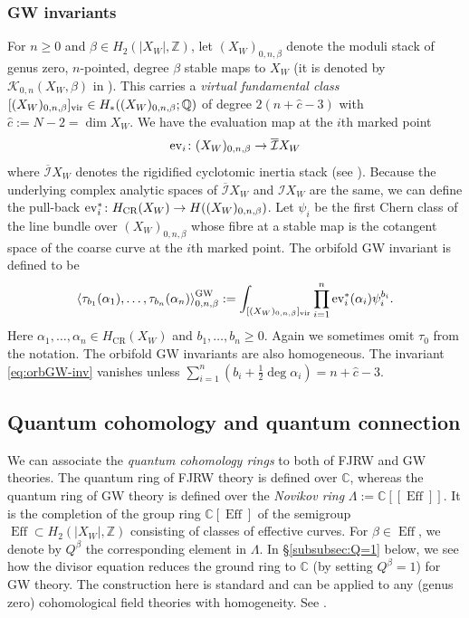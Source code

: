 \documentclass[11pt]{amsart}
\theoremstyle{definition} %
\theoremstyle{remark} %
\newcommand{\CC}{\mathbb C}
\newcommand{\QQ}{\mathbb Q}
\newcommand{\ZZ}{\mathbb Z}
\newcommand{\ev}{{\rm ev}}
\def\GW{\operatorname{\text{GW}}}
\def\CR{\operatorname{\text{CR}}}
\def\corr#1{\left\langle #1 \right\rangle}
\newcommand{\cI}{\mathcal{I}}
\newcommand{\hc}{\hat{c}}
\renewcommand{\GW}{{\operatorname{GW}}}
\renewcommand{\CR}{{\operatorname{CR}}}
\newcommand{\Eff}{\operatorname{Eff}}
\newcommand{\ov}{\overline}
\begin{document}
\subsubsection{GW invariants} 
For $n\ge 0$ and $\beta \in H_2(|X_W|,\ZZ)$, 
let $(X_W)_{0,n,\beta}$ denote the moduli stack 
of genus zero, $n$-pointed, degree $\beta$ 
stable maps to $X_W$ (it is 
denoted by $\mathcal{K}_{0,n}(X_W,\beta)$ in \cite{AGV}). 
This carries a \emph{virtual fundamental class} 
$[(X_W)_{0,n,\beta}]_{\rm vir} \in H_*((X_W)_{0,n,\beta};\QQ)$ 
of degree $2(n+\hc -3)$ with $\hc := N- 2 = \dim X_W$. 
We have the evaluation map at the $i$th marked point 
\[
\ev_i \colon (X_W)_{0,n,\beta} \to \ov{\cI}X_W 
\]
where $\ov{\cI}X_W$ denotes the rigidified cyclotomic 
inertia stack (see \cite{AGV}). 
Because the underlying complex analytic spaces of 
$\ov{\cI}X_W$ and $\cI X_W$ are the same, we can define 
the pull-back $\ev_i^* \colon H_{\CR}(X_W) 
\to H((X_W)_{0,n,\beta})$. 
Let $\psi_i$ be the first Chern class of the 
line bundle over $(X_W)_{0,n,\beta}$ whose fibre 
at a stable map is the cotangent space of the 
coarse curve at the $i$th marked point. 
The orbifold GW 
invariant is defined to be 
\begin{equation} 
\label{eq:orbGW-inv} 
\corr{\tau_{b_1}(\alpha_1),\dots,\tau_{b_n}( \alpha_n)
}^{\GW}_{0,n,\beta} 
:= \int_{[(X_W)_{0,n,\beta}]_{\rm vir}} 
\prod_{i=1}^n \ev_i^*(\alpha_i) \psi_i^{b_i}. 
\end{equation} 
Here $\alpha_1,\dots,\alpha_n \in H_{\CR}(X_W)$ and 
$b_1,\dots,b_n\ge 0$. Again we sometimes 
omit $\tau_0$ from the notation. The orbifold GW 
invariants are also homogeneous. The invariant 
\eqref{eq:orbGW-inv} vanishes unless 
$\sum_{i=1}^n (b_i + \frac{1}{2} \deg \alpha_i) 
= n+ \hc -3$. 

\subsection{Quantum cohomology and quantum connection} 
\label{subsec:qcoh_conn} 
We can associate the \emph{quantum cohomology rings} 
to both of FJRW and GW theories. 
The quantum ring of FJRW theory is defined over $\CC$, 
whereas the quantum ring of GW theory is defined over the 
\emph{Novikov ring} $\Lambda := \CC[\![\Eff]\!]$. 
It is the completion of the group ring $\CC[\Eff]$ of 
the semigroup $\Eff\subset H_2(|X_W|,\ZZ)$ 
consisting of classes of effective curves. 
For $\beta\in \Eff$, we denote by $Q^\beta$ the corresponding 
element in $\Lambda$. 
In \S \ref{subsubsec:Q=1} below, 
we see how the divisor equation reduces 
the ground ring to $\CC$ (by setting $Q^\beta =1$) 
for GW theory. 
The construction here is standard and 
can be applied to any (genus zero) 
cohomological field theories with homogeneity. 
See \cite{Manin}.   
\end{document}
